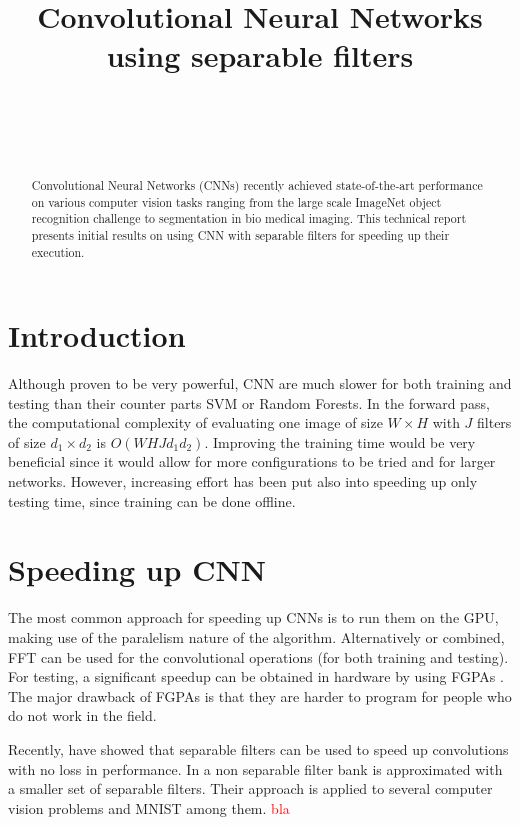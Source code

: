 \documentclass{article} %
\title{Convolutional Neural Networks using separable filters}
\author{
\fontsize{8}{8}\selectfont{Petrescu Viviana}\\
\fontsize{8}{8}\selectfont{EPFL} \\
\fontsize{8}{8}\selectfont{\texttt{viviana.petrescu@epfl.ch}} \\
}
\begin{document}
\maketitle

\begin{abstract}
Convolutional Neural Networks (CNNs) recently achieved state-of-the-art performance on various computer vision tasks ranging from the large scale ImageNet object recognition challenge to segmentation in bio medical imaging.
This technical report presents initial results on using CNN with separable filters for speeding up their execution.
\end{abstract}

\section{Introduction}
Although proven to be very powerful, CNN are much slower for both training and testing than their counter parts SVM or Random Forests.
In the forward pass, the computational complexity of evaluating one image of size $W\times H$ with $J$ filters of size $d_{1}\times d_{2}$ is $O(WHJd_{1}d_{2})$.
Improving the training time would be very beneficial since it would allow for more configurations to be tried and for larger networks. However, increasing effort has been put also into speeding up only testing time, since training can be done offline.

\section{Speeding up CNN}
The most common approach for speeding up CNNs is to run them on the GPU, making use of the paralelism nature of the algorithm. Alternatively or combined, FFT can be used for the convolutional operations (for  both training and testing)\cite{DBLP:journals/corr/MathieuHL13}.  For testing, a significant speedup can be obtained in hardware by using FGPAs \citep{lecun2010convolutional}. The major drawback of FGPAs is that they are harder to program for people who do not work in the field.

Recently,\citep{Jaderberg14b}  \citep{DBLP:dblp_journals/pami/SironiTRLF15} have showed that separable filters can be used to speed up convolutions with no loss in performance.
In \citep{DBLP:dblp_journals/pami/SironiTRLF15} a non separable filter bank is approximated with a smaller set of separable filters. Their approach is applied to several computer vision problems and MNIST among them. \textcolor{red}{bla} 
\end{document}
